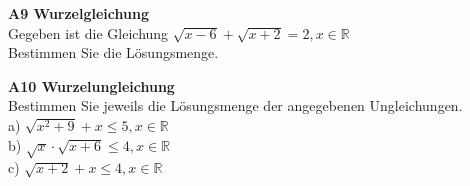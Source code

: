 \documentclass[landscape,twocolumn,a4paper]{article}
\begin{document}
\textbf{A9 Wurzelgleichung} \\
Gegeben ist die Gleichung $\sqrt{x-6} + \sqrt{x+2} = 2, x \in \mathbb{R}$ \\
Bestimmen Sie die Lösungsmenge.
\bigskip

\textbf{A10 Wurzelungleichung} \\
Bestimmen Sie jeweils die Lösungsmenge der angegebenen Ungleichungen. \\
a) $\sqrt{x^2+9} + x \le 5,  x \in \mathbb{R}$ \\
b) $\sqrt{x} \cdot \sqrt{x+6} \le 4,  x \in \mathbb{R}$ \\
c) $\sqrt{x+2} + x \le 4,  x \in \mathbb{R}$ 
\bigskip
\end{document}
